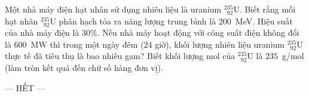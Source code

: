 	\begin{ex}%
		Một nhà máy điện hạt nhân sử dụng nhiên liệu là uranium ${}^{235}_{\phantom{2}92}\text{U}$. Biết rằng mỗi hạt nhân ${}^{235}_{\phantom{2}92}\text{U}$ phân hạch tỏa ra năng lượng trung bình là $200$~MeV. Hiệu suất của nhà máy điện là $30\%$. Nếu nhà máy hoạt động với công suất điện không đổi là $600$~MW thì trong một ngày đêm ($24$ giờ), khối lượng nhiên liệu uranium ${}^{235}_{\phantom{2}92}\text{U}$ thực tế đã tiêu thụ là bao nhiêu gam? Biết khối lượng mol của ${}^{235}_{\phantom{2}92}\text{U}$ là $235$~g/mol (làm tròn kết quả đến chữ số hàng đơn vị).
		\par
	\end{ex}

	\centerline{--- HẾT ---}


